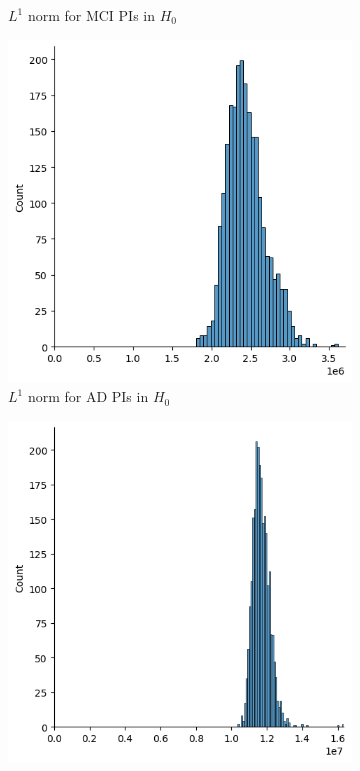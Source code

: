 \documentclass{article}
\begin{document}
\begin{figure}
\begin{subfigure}{0.32\textwidth}
    \caption{$L^1$ norm for MCI PIs in $H_0$}
  \end{subfigure}
  \begin{subfigure}{0.32\textwidth}
    \includegraphics[width=\textwidth]{figures/PIs/displot_median_pi_AD_H_0.png}
    \caption{$L^1$ norm for AD PIs in $H_0$}
  \end{subfigure}
  \begin{subfigure}{0.32\textwidth}
    \includegraphics[width=\textwidth]{figures/PIs/displot_median_pi_CN_H_1.png}

\end{subfigure}
\end{figure}
\end{document}
